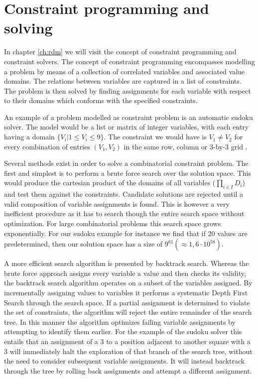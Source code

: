 \section{Constraint programming and solving}
\label{sec:back:constraint}
In chapter \ref{ch:rdm} we will visit the concept of constraint programming and constraint solvers. The concept of constraint programming encompasses modelling a problem by means of a collection of correlated variables and associated value domains. The relations between variables are captured in a list of constraints. The problem is then solved by finding assignments for each variable with respect to their domains which conforms with the specified constraints. 

An example of a problem modelled as constraint problem is an automatic sudoku solver. The model would be a list or matrix of integer variables, with each entry having a domain $\{V_i|1\leq V_i\leq 9\}$. The constraint we would have is $V_1 \neq V_2$ for every combination of entries $(V_1,V_2)$ in the same row, column or 3-by-3 grid .

Several methods exist in order to solve a combinatorial constraint problem. The first and simplest is to perform a brute force search over the solution space. This would produce the cartesian product of the domains of all variables ($\prod_{i\in I} D_i$) and test them against the constraints. Candidate solutions are rejected until a valid composition of variable assignments is found. This is however a very inefficient procedure as it has to search though the entire search space without optimization. For large combinatorial problems this search space grows exponentially. For our sudoku example for instance we find that if 20 values are predetermined, then our solution space has a size of $9^{61}(\approx 1,6\cdot 10^{58})$.

A more efficient search algorithm is presented by backtrack search. Whereas the brute force approach assigns every variable a value and then checks its validity, the backtrack search algorithm operates on a subset of the variables assigned. By incrementally assigning values to variables it performs a systematic Depth First Search through the search space. If a partial assignment is determined to violate the set of constraints, the algorithm will reject the entire remainder of the search tree. In this manner the algorithm optimizes failing variable assignments by attempting to identify them earlier. For the example of the sudoku solver this entails that an assignment of a 3 to a position adjacent to another square with a 3 will immediately halt the exploration of that branch of the search tree, without the need to consider subsequent variable assignments. It will instead backtrack through the tree by rolling back assignments and attempt a different assignment.

